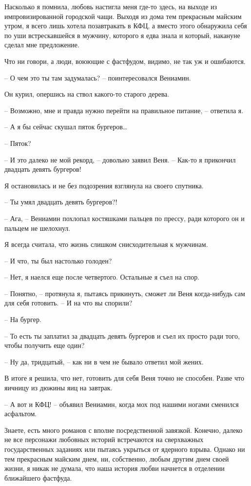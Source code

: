 \documentclass[
]{book}
\begin{document}
Насколько я помнила, любовь настигла меня где-то здесь, на выходе из импровизированной городской чащи. Выходя из дома тем прекрасным майским утром, я всего лишь хотела позавтракать в КФЦ, а вместо этого обнаружила себя по уши встрескавшейся в мужчину, которого я едва знала и который, накануне сделал мне предложение.

Что ни говори, а люди, воюющие с фастфудом, видимо, не так уж и ошибаются.

-- О чем это ты там задумалась? -- поинтересовался Вениамин.

Он курил, опершись на ствол какого-то старого дерева.

-- Возможно, мне и правда нужно перейти на правильное питание, -- ответила я.

-- А я бы сейчас скушал пяток бургеров\ldots{}

-- Пяток?

-- И это далеко не мой рекорд, -- довольно заявил Веня. -- Как-то я прикончил двадцать девять бургеров!

Я остановилась и не без подозрения взглянула на своего спутника.

-- Ты умял двадцать девять бургеров?!

-- Ага, -- Вениамин похлопал костяшками пальцев по прессу, ради которого он и пальцем не шелохнул.

Я всегда считала, что жизнь слишком снисходительная к мужчинам.

-- И что, ты был настолько голоден?

-- Нет, я наелся еще после четвертого. Остальные я съел на спор.

-- Понятно, -- протянула я, пытаясь прикинуть, сможет ли Веня когда-нибудь сам для себя готовить. -- И на что вы спорили?

-- На бургер.

-- То есть ты заплатил за двадцать девять бургеров и съел их просто ради того, чтобы получить еще один?

-- Ну да, тридцатый, -- как ни в чем не бывало ответил мой жених.

В итоге я решила, что нет, готовить для себя Веня точно не способен. Разве что яичницу из дюжины яиц на завтрак.

-- А вот и КФЦ! -- объявил Вениамин, когда мох под нашими ногами сменился асфальтом.

Знаете, есть много романов с вполне посредственной завязкой. Конечно, далеко не все персонажи любовных историй встречаются на сверхважных государственных заданиях или пытаясь укрыться от ядерного взрыва. Однако ни тем прекрасным майским днем, ни, собственно, любым другим днем своей жизни, я никак не думала, что наша история любви начнется в отделении ближайшего фастфуда.
\end{document}
